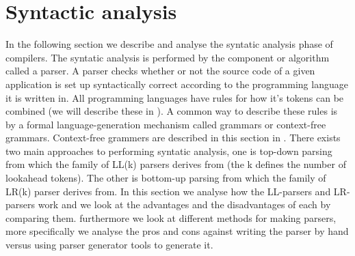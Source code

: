 \section{Syntactic analysis}

In the following section we describe and analyse the syntatic analysis phase of compilers. The syntatic analysis is performed by the component or algorithm called a parser. A parser checks whether or not the source code of a given application is set up syntactically correct according to the programming language it is written in. All programming languages have rules for how it's tokens can be combined (we will describe these in ). 
A common way to describe these rules is by a formal language-generation mechanism called grammars or context-free grammars. Context-free grammers are described in this section in . There exists two main approaches to performing syntatic analysis, one is top-down parsing from which the family of LL(k) parsers derives from (the k defines the number of lookahead tokens). The other is bottom-up parsing from which the family of LR(k) parser derives from. In this section we analyse how the LL-parsers and LR-parsers work and we look at the advantages and the disadvantages of each by comparing them. 
furthermore we look at different methods for making parsers, more specifically we analyse the pros and cons against writing the parser by hand versus using parser generator tools to generate it.






